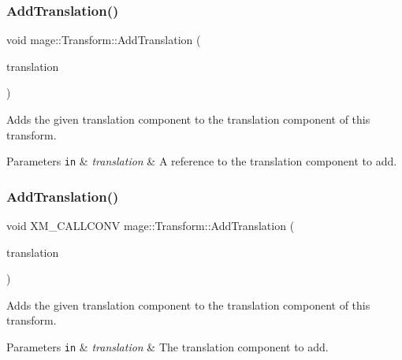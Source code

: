\subsubsection{\texorpdfstring{Add\+Translation()}{AddTranslation()}\hspace{0.1cm}{\footnotesize\ttfamily [2/3]}}
{\footnotesize\ttfamily void mage\+::\+Transform\+::\+Add\+Translation (\begin{DoxyParamCaption}\item[{const X\+M\+F\+L\+O\+A\+T3 \&}]{translation }\end{DoxyParamCaption})\hspace{0.3cm}{\ttfamily [noexcept]}}

Adds the given translation component to the translation component of this transform.


\begin{DoxyParams}[1]{Parameters}
\mbox{\tt in}  & {\em translation} & A reference to the translation component to add. \\
\hline
\end{DoxyParams}
\hypertarget{classmage_1_1_transform_a931911a2ef61b9a74be444e4c65ee46a}{}\label{classmage_1_1_transform_a931911a2ef61b9a74be444e4c65ee46a} 
\subsubsection{\texorpdfstring{Add\+Translation()}{AddTranslation()}\hspace{0.1cm}{\footnotesize\ttfamily [3/3]}}
{\footnotesize\ttfamily void X\+M\+\_\+\+C\+A\+L\+L\+C\+O\+NV mage\+::\+Transform\+::\+Add\+Translation (\begin{DoxyParamCaption}\item[{F\+X\+M\+V\+E\+C\+T\+OR}]{translation }\end{DoxyParamCaption})\hspace{0.3cm}{\ttfamily [noexcept]}}

Adds the given translation component to the translation component of this transform.


\begin{DoxyParams}[1]{Parameters}
\mbox{\tt in}  & {\em translation} & The translation component to add. \\
\hline
\end{DoxyParams}
\hypertarget{classmage_1_1_transform_a1161f8c965e071dd59f1780d7a06952b}{}\label{classmage_1_1_transform_a1161f8c965e071dd59f1780d7a06952b} 
